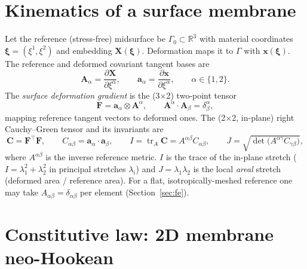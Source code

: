 \documentclass[11pt]{article}
\newcommand{\vv}[1]{\bm{#1}}          %
\newcommand{\FF}{\vv{F}}               %
\newcommand{\CC}{\vv{C}}               %
\newcommand{\xx}{\vv{x}}               %
\newcommand{\XX}{\vv{X}}               %
\newcommand{\tp}{\otimes}
\newcommand{\R}{\mathbb{R}}
\newcommand{\tr}{\operatorname{tr}}
\begin{document}
\section{Kinematics of a surface membrane}
\label{sec:kinematics}

Let the reference (stress-free) midsurface be $\Gamma_0\subset\R^3$ with material
coordinates $\vv\xi=(\xi^1,\xi^2)$ and embedding $\XX(\vv\xi)$. Deformation maps it to
$\Gamma$ with $\xx(\vv\xi)$. The reference and deformed covariant tangent bases are
\begin{equation}
  \vv A_\alpha=\frac{\partial\XX}{\partial\xi^\alpha},\qquad
  \vv a_\alpha=\frac{\partial\xx}{\partial\xi^\alpha},\qquad \alpha\in\{1,2\}.
\end{equation}
The \emph{surface deformation gradient} is the (3$\times$2) two-point tensor
\begin{equation}
  \FF=\vv a_\alpha\tp \vv A^\alpha,
  \qquad \vv A^\alpha\cdot\vv A_\beta=\delta^\alpha_\beta,
\end{equation}
mapping reference tangent vectors to deformed ones. The (2$\times$2, in-plane) right
Cauchy--Green tensor and its invariants are
\begin{equation}
  \CC=\FF^{\!\top}\FF,\qquad
  C_{\alpha\beta}=\vv a_\alpha\cdot\vv a_\beta,\qquad
  I=\tr_{A}\CC=A^{\alpha\beta}C_{\alpha\beta},\qquad
  J=\sqrt{\det\!\big(A^{\alpha\gamma}C_{\gamma\beta}\big)},
\end{equation}
where $A^{\alpha\beta}$ is the inverse reference metric. $I$ is the trace of the
in-plane stretch ($I=\lambda_1^2+\lambda_2^2$ in principal stretches $\lambda_i$) and
$J=\lambda_1\lambda_2$ is the local \emph{areal} stretch (deformed area / reference
area). For a flat, isotropically-meshed reference one may take $A_{\alpha\beta}
=\delta_{\alpha\beta}$ per element (Section~\ref{sec:fe}).

\section{Constitutive law: 2D membrane neo-Hookean}
\label{sec:const}
\end{document}
